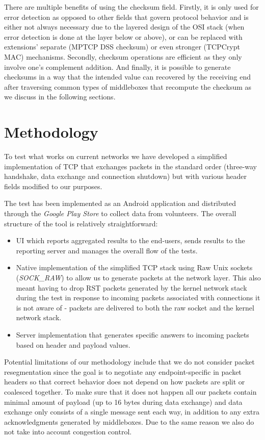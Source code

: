 \documentclass{sig-alternate-10pt}
\begin{document}
There are multiple benefits of using the checksum field. Firstly, it is only used for error detection as opposed to other fields that govern protocol behavior and is either not always necessary due to the layered design of the OSI stack (when error detection is done at the layer below or above), or can be replaced with extensions' separate (MPTCP DSS checksum) or even stronger (TCPCrypt MAC) mechanisms. Secondly, checksum operations are efficient as they only involve one's complement addition. And finally, it is possible to generate checksums in a way that the intended value can recovered by the receiving end after traversing common types of middleboxes that recompute the checksum as we discuss in the following sections.


\section{Methodology}

To test what works on current networks we have developed a simplified implementation of TCP that exchanges packets in the standard order (three-way handshake, data exchange and connection shutdown) but with various header fields modified to our purposes.

The test has been implemented as an Android application and distributed through the \emph{Google Play Store} to collect data from volunteers. The overall structure of the tool is relatively straightforward:
\begin{itemize}
    \item UI which reports aggregated results to the end-users, sends results to the reporting server and manages the overall flow of the tests.
    \item Native implementation of the simplified TCP stack using Raw Unix sockets (\emph{SOCK\_RAW}) to allow us to generate packets at the network layer. This also meant having to drop RST packets generated by the kernel network stack during the test in response to incoming packets associated with connections it is not aware of - packets are delivered to both the raw socket and the kernel network stack.
    \item Server implementation that generates specific answers to incoming packets based on header and payload values.
\end{itemize}

Potential limitations of our methodology include that we do not consider packet resegmentation since the goal is to negotiate any endpoint-specific in packet headers so that correct behavior does not depend on how packets are split or coalesced together. To make sure that it does not happen all our packets contain minimal amount of payload (up to 16 bytes during data exchange) and data exchange only consists of a single message sent each way, in addition to any extra acknowledgments generated by middleboxes. Due to the same reason we also do not take into account congestion control.
\end{document}
